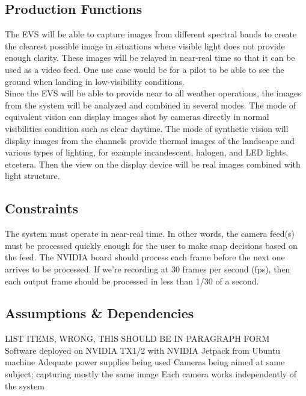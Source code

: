\documentclass[letterpaper,10pt,serif,draftclsnofoot,onecolumn,compsoc,titlepage]{IEEEtran}
\begin{document}
\subsection{Production Functions}

The EVS will be able to capture images from different spectral bands to create the 
clearest possible image in situations where visible light does not provide enough 
clarity. These images will be relayed in near-real time so that it can be used as a 
video feed. One use case would be for a pilot to be able to see the ground when landing 
in low-visibility conditions.\\

Since the EVS will be able to provide near to all weather operations, the images from 
the system will be analyzed and combined in several modes. The mode of equivalent 
vision can display images shot by cameras directly in normal visibilities condition 
such as clear daytime. The mode of synthetic vision will display images from the 
channels provide thermal images of the landscape and various types of lighting, for 
example incandescent, halogen, and LED lights, etcetera. Then the view on the display 
device will be real images combined with light structure.\\

\subsection{Constraints}

The system must operate in near-real time. In other words, the camera feed(s) must be 
processed quickly enough for the user to make snap decisions based on the feed. The 
NVIDIA board should process each frame before the next one arrives to be processed. 
If we’re recording at 30 frames per second (fps), then each output frame should be 
processed in less than 1/30 of a second.\\

\subsection{Assumptions \& Dependencies}

LIST ITEMS, WRONG, THIS SHOULD BE IN PARAGRAPH FORM\\
Software deployed on NVIDIA TX1/2 with NVIDIA Jetpack from Ubuntu machine
Adequate power supplies being used
Cameras being aimed at same subject; capturing mostly the same image
Each camera works independently of the system
\end{document}
